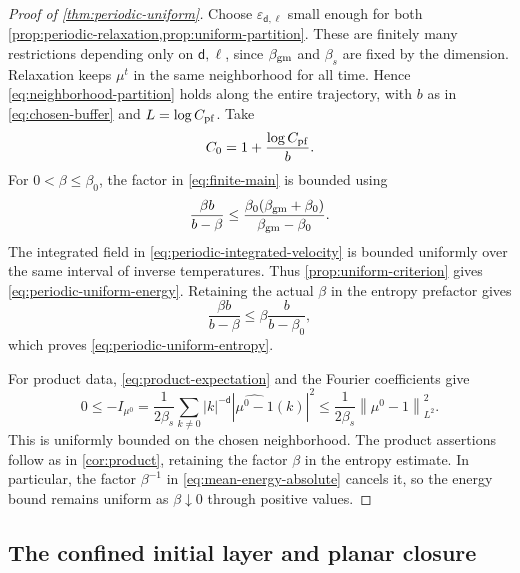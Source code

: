 \documentclass[11pt,reqno]{amsart}
\numberwithin{equation}{section}
\theoremstyle{definition}
\theoremstyle{remark}
\renewcommand{\d}{\mathsf d}
\newcommand{\norm}[1]{\left\lVert#1\right\rVert}
\begin{document}
\begin{proof}[Proof of \cref{thm:periodic-uniform}]
Choose $\varepsilon_{\d,\ell}$ small enough for both \cref{prop:periodic-relaxation,prop:uniform-partition}. These are finitely many restrictions depending only on $\d,\ell$, since $\beta_{\rm gm}$ and $\beta_s$ are fixed by the dimension. Relaxation keeps $\mu^t$ in the same neighborhood for all time. Hence \eqref{eq:neighborhood-partition} holds along the entire trajectory, with $b$ as in \eqref{eq:chosen-buffer} and $L=\log C_{\rm pf}$. Take
\begin{equation}\label{eq:uniform-shift}
 C_0=1+\frac{\log C_{\rm pf}}b.
\end{equation}
For $0<\beta\leq\beta_0$, the factor in \eqref{eq:finite-main} is bounded using
\begin{equation}\label{eq:uniform-buffer-factor}
 \frac{\beta b}{b-\beta}\leq
 \frac{\beta_0(\beta_{\rm gm}+\beta_0)}{\beta_{\rm gm}-\beta_0}.
\end{equation}
The integrated field in \eqref{eq:periodic-integrated-velocity} is bounded uniformly over the same interval of inverse temperatures. Thus \cref{prop:uniform-criterion} gives \eqref{eq:periodic-uniform-energy}. Retaining the actual $\beta$ in the entropy prefactor gives
\begin{equation}\label{eq:retain-beta}
 \frac{\beta b}{b-\beta}\leq\beta\frac{b}{b-\beta_0},
\end{equation}
which proves \eqref{eq:periodic-uniform-entropy}.

For product data, \eqref{eq:product-expectation} and the Fourier coefficients give
\begin{equation}\label{eq:periodic-product-initial}
 0\leq-I_{\mu^0}
 =\frac1{2\beta_s}\sum_{k\ne0}|k|^{-\d}|\widehat{\mu^0-1}(k)|^2
 \leq\frac1{2\beta_s}\norm{\mu^0-1}_{L^2}^2.
\end{equation}
This is uniformly bounded on the chosen neighborhood. The product assertions follow as in \cref{cor:product}, retaining the factor $\beta$ in the entropy estimate. In particular, the factor $\beta^{-1}$ in \eqref{eq:mean-energy-absolute} cancels it, so the energy bound remains uniform as $\beta\downarrow0$ through positive values.
\end{proof}

\begingroup\ifdefined\MarkedRevision\color{red}\fi
\subsection{The confined initial layer and planar closure}\label{subsec:confined-uniform-proof}
\end{document}
